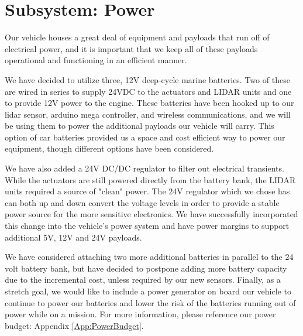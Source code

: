 \chapter{Subsystem: Power}

Our vehicle houses a great deal of equipment and payloads that run off of electrical power, and it is important that we keep all of these payloads operational and functioning in an efficient manner.

We have decided to utilize three, 12V deep-cycle marine batteries. Two of these are wired in series to supply 24VDC to the actuators and LIDAR units and one to provide 12V power to the engine. These batteries have been hooked up to our lidar sensor, arduino mega controller, and wireless communications, and we will be using them to power the additional payloads our vehicle will carry. This option of car batteries provided us a space and cost efficient way to power our equipment, though different options have been considered.

We have also added a 24V DC/DC regulator to filter out electrical transients. While the actuators are still powered directly from the battery bank, the LIDAR units required a source of "clean" power. The 24V regulator which we chose has can both up and down convert the voltage levels in order to provide a stable power source for the more sensitive electronics. We have successfully incorporated this change into the vehicle's power system and have power margins to support additional 5V, 12V and 24V payloads.

We have considered attaching two more additional batteries in parallel to the 24 volt battery bank, but have decided to postpone adding more battery capacity due to the incremental cost, unless required by our new sensors. Finally, as a stretch goal, we would like to include a power generator on board our vehicle to continue to power our batteries and lower the risk of the batteries running out of power while on a mission.
For more information, please reference our power budget: Appendix \ref{App:PowerBudget}.